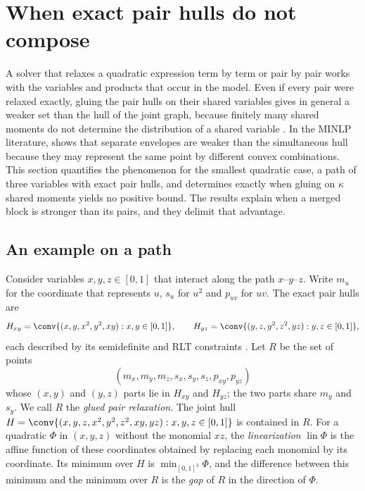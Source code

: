 \section{When exact pair hulls do not compose}\label{sec:composition}

A solver that relaxes a quadratic expression term by term or pair by pair
works with the variables and products that occur in the model. Even if
every pair were relaxed exactly, gluing the pair hulls on their shared
variables gives in general a weaker set than the hull of the joint graph,
because finitely many shared moments do not determine the distribution of a
shared variable \citep{Lasserre2006,NieDemmel2009,FantuzziFuentes2025}. In
the MINLP literature, \citet[Example~3.8]{Tawarmalani2010} shows that
separate envelopes are weaker than the simultaneous hull because they may
represent the same point by different convex combinations. This section
quantifies the phenomenon for the smallest quadratic case, a path of three
variables with exact pair hulls, and determines exactly when gluing on
$\kappa$ shared moments yields no positive bound. The results explain when
a merged block is stronger than its pairs, and they delimit that advantage.

\subsection{An example on a path}\label{sec:path-example}

Consider variables $x,y,z\in[0,1]$ that interact along the path
$x$--$y$--$z$. Write $m_u$ for the coordinate that represents $u$, $s_u$
for $u^2$ and $p_{uv}$ for $uv$. The exact pair hulls are
\[
H_{xy}=\conv\{(x,y,x^2,y^2,xy):x,y\in[0,1]\},\qquad
H_{yz}=\conv\{(y,z,y^2,z^2,yz):y,z\in[0,1]\},
\]
each described by its semidefinite and RLT constraints
\citep{AnstreicherBurer2010}. Let $R$ be the set of points
\[
(m_x,m_y,m_z,s_x,s_y,s_z,p_{xy},p_{yz})
\]
whose $(x,y)$ and $(y,z)$ parts lie in $H_{xy}$ and $H_{yz}$; the two parts
share $m_y$ and $s_y$. We call $R$ the \emph{glued pair relaxation}. The
joint hull $H=\conv\{(x,y,z,x^2,y^2,z^2,xy,yz):x,y,z\in[0,1]\}$ is
contained in $R$. For a quadratic $\Phi$ in $(x,y,z)$ without the monomial
$xz$, the \emph{linearization} $\operatorname{lin}\Phi$ is the affine
function of these coordinates obtained by replacing each monomial by its
coordinate. Its minimum over $H$ is $\min_{[0,1]^3}\Phi$, and the
difference between this minimum and the minimum over $R$ is the
\emph{gap} of $R$ in the direction of $\Phi$.

